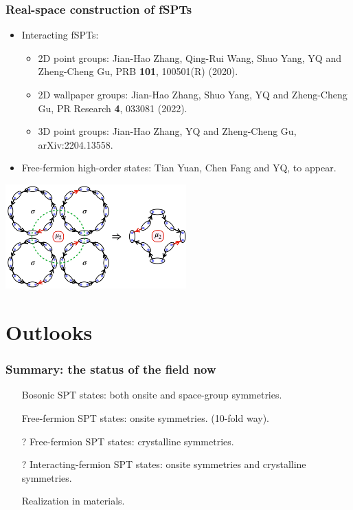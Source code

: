 \documentclass[xcolor=table, aspectratio=169,ignorenonframetext]{beamer}
\begin{document}
\begin{frame}
  \frametitle{Real-space construction of fSPTs}

  \begin{itemize}
  \item Interacting fSPTs:
    \begin{itemize}
    \item 2D point groups: Jian-Hao Zhang, Qing-Rui Wang, Shuo Yang, YQ and Zheng-Cheng Gu,
      PRB \textbf{101}, 100501(R) (2020).
    \item 2D wallpaper groups: Jian-Hao Zhang, Shuo Yang, YQ and Zheng-Cheng Gu,
      PR Research \textbf{4}, 033081 (2022).
    \item 3D point groups: Jian-Hao Zhang, YQ and Zheng-Cheng Gu, arXiv:2204.13558.
    \end{itemize}
  \item Free-fermion high-order states:
    Tian Yuan, Chen Fang and YQ, to appear.
  \end{itemize}
  \begin{center}
    \includegraphics[height=4cm]{../spspt/majorana_bubble}    
  \end{center}
\end{frame}
\section{Outlooks}

\begin{frame}
  \frametitle{Summary: the status of the field now}
  \begin{itemize}
  \item[\ding{51}] Bosonic SPT states: both onsite and space-group symmetries.
  \item[\ding{51}] Free-fermion SPT states: onsite symmetries. (10-fold way).
  \item[?] Free-fermion SPT states: crystalline symmetries.
  \item[?] Interacting-fermion SPT states: onsite symmetries and crystalline symmetries.
  \item[\ding{55}] Realization in materials.
  \end{itemize}
\end{frame}
\end{document}
